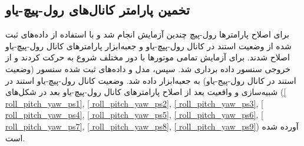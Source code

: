 \subsection{تخمین پارامتر کانال‌های رول-پیچ-یاو}
برای اصلاح پارامترها رول-پیچ چندین آزمایش انجام شد و با استفاده از داده‌های ثبت شده از وضعیت استند در کانال رول-پپچ-یاو و جعبه‌ابزار
پارامترهای کانال رول-پیچ-یاو اصلاح شدند.
برای آزمایش تمامی موتورها با دور مختلف شروع به حرکت کردند و از خروجی سنسور داده برداری شد. سپس، مدل و  داده‌های ثبت شده سنسور (وضعیت استند در کانال رول-پیج-یاو) به جعبه‌ابزار
داده شد. وضعیت کانال رول-پیچ-یاو استند در شبیه‌سازی و واقعیت بعد از اصلاح پارامترهای کانال‌ رول-پیچ-یاو بعد در شکل‌های
(\ref{ roll_pitch_yaw_ps1}, \ref{ roll_pitch_yaw_ps2}, \ref{ roll_pitch_yaw_ps3}, \ref{ roll_pitch_yaw_ps4}, \ref{ roll_pitch_yaw_ps5}, \ref{ roll_pitch_yaw_ps6}, \ref{ roll_pitch_yaw_ps7}, \ref{ roll_pitch_yaw_ps8}, \ref{ roll_pitch_yaw_ps9})
آورده شده است.

%	

